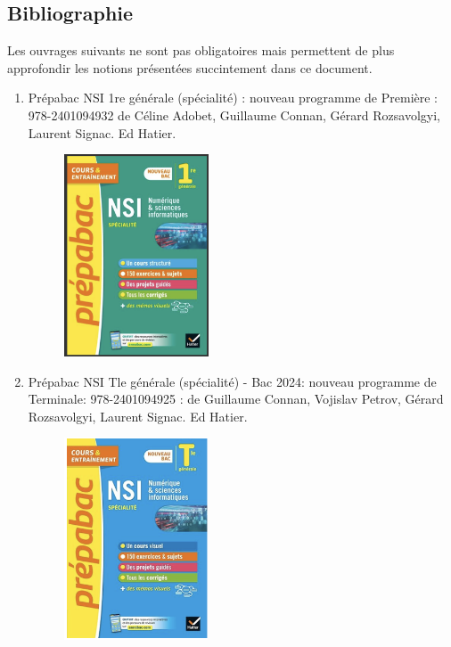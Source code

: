 \documentclass[a4paper,12pt]{article}
\begin{document}
\subsection{Bibliographie}
Les ouvrages suivants ne sont pas obligatoires mais permettent de plus approfondir les notions pr\'esent\'ees succintement dans ce document.
\begin{enumerate}
\item Prépabac NSI 1re générale (spécialité) : nouveau programme de Première : 978-2401094932 de Céline Adobet, Guillaume Connan, Gérard Rozsavolgyi, Laurent Signac. Ed Hatier.
\begin{figure}[h]
\begin{center}
\includegraphics[height=6cm]{./png/hatier-python-1ere}
\end{center}
\end{figure}
\item Prépabac NSI Tle générale (spécialité) - Bac 2024: nouveau programme de Terminale: 978-2401094925 : 
de Guillaume Connan, Vojislav Petrov, Gérard Rozsavolgyi, Laurent Signac. Ed Hatier.
\begin{figure}[h]
\begin{center}
\includegraphics[height=6cm]{./png/hatier-python-term}
\end{center}
\end{figure}
\end{enumerate}
\clearpage
\end{document}
